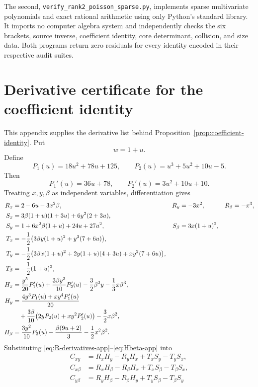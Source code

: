 \documentclass[11pt]{article}
\theoremstyle{remark}
\begin{document}
The second, \texttt{verify\_rank2\_poisson\_sparse.py}, implements sparse
multivariate polynomials and exact rational arithmetic using only Python's
standard library.  It imports no computer algebra system and independently
checks the six brackets, source inverse, coefficient identity, core
determinant, collision, and size data.  Both programs return zero residuals
for every identity encoded in their respective audit suites.

\appendix

\section{Derivative certificate for the coefficient identity}
\label{app:derivative-certificate}

This appendix supplies the derivative list behind
Proposition~\ref{prop:coefficient-identity}.  Put
\[
  w=1+u.
\]
Define
\[
  P_1(u)=18u^2+78u+125,
  \qquad
  P_2(u)=u^3+5u^2+10u-5.
\]
Then
\[
  P_1'(u)=36u+78,
  \qquad
  P_2'(u)=3u^2+10u+10.
\]
Treating \(x,y,\beta\) as independent variables, differentiation gives
\begin{align}
  R_x&=2-6u-3x^2\beta,
  &R_y&=-3x^2,
  &R_\beta&=-x^3,
  \label{eq:R-derivatives-app}\\
  S_x&=3\beta(1+u)(1+3u)+6y^2(2+3u),
  \label{eq:Sx-app}\\
  S_y&=1+6x^2\beta(1+u)+24u+27u^2,
  &S_\beta&=3x(1+u)^2,
  \label{eq:Sy-Sbeta-app}\\
  T_x&=-\frac12\bigl(3\beta y(1+u)^2+y^3(7+6u)\bigr),
  \label{eq:Tx-app}\\
  T_y&=-\frac12\bigl(3\beta x(1+u)^2
       +2y(1+u)(4+3u)+xy^2(7+6u)\bigr),
  \label{eq:Ty-app}\\
  T_\beta&=-\frac12(1+u)^3,
  \label{eq:Tbeta-app}\\
  H_x&=\frac{y^5}{20}P_1'(u)
       +\frac{3\beta y^3}{10}P_2'(u)
       -\frac32\beta^2y-\frac13x\beta^3,
  \label{eq:Hx-app}\\
  H_y&=\frac{4y^3P_1(u)+xy^4P_1'(u)}{20}\notag\\
     &\quad+\frac{3\beta}{10}
       \bigl(2yP_2(u)+xy^2P_2'(u)\bigr)
       -\frac32x\beta^2,
  \label{eq:Hy-app}\\
  H_\beta&=\frac{3y^2}{10}P_2(u)
       -\frac{\beta(9u+2)}3-\frac12x^2\beta^2.
  \label{eq:Hbeta-app}
\end{align}
Substituting \eqref{eq:R-derivatives-app}--\eqref{eq:Hbeta-app} into
\begin{align*}
  C_{xy}&=R_xH_y-R_yH_x+T_xS_y-T_yS_x,\\
  C_{x\beta}&=R_xH_\beta-R_\beta H_x
                +T_xS_\beta-T_\beta S_x,\\
  C_{y\beta}&=R_yH_\beta-R_\beta H_y
                +T_yS_\beta-T_\beta S_y
\end{align*}
\end{document}
